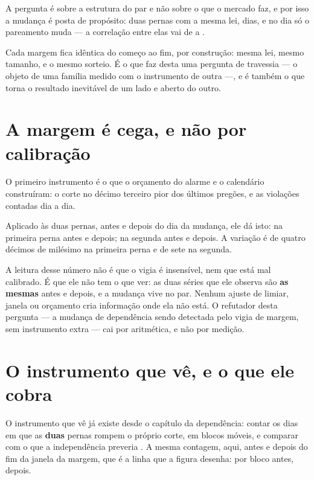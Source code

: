 A pergunta é sobre a estrutura do par e não sobre o que o mercado faz, e por isso a mudança é posta de
propósito: duas pernas com a mesma lei, \numVizinhancaDias{} dias, e no dia
\numVizinhancaQuando{} só o pareamento muda --- a correlação entre elas vai de
\numVizinhancaRhoAntes{} a \numVizinhancaRhoDepois.

Cada margem fica idêntica do começo ao fim, por construção: mesma lei, mesmo tamanho, e o mesmo
sorteio. É o que faz desta uma pergunta de travessia --- o objeto de uma família medido com o
instrumento de outra ---, e é também o que torna o resultado inevitável de um lado e aberto do
outro.

\section{A margem é cega, e não por calibração}

O primeiro instrumento é o que o orçamento do alarme e o calendário construíram: o corte no décimo terceiro pior dos
últimos \numCorteJanela{} pregões, e as violações contadas dia a dia.

Aplicado às duas pernas, antes e depois do dia da mudança, ele dá isto: \numVizinhancaTaxaAAntes{}
na primeira perna antes e \numVizinhancaTaxaADepois{} depois; \numVizinhancaTaxaBAntes{} na segunda
antes e \numVizinhancaTaxaBDepois{} depois. A variação é de quatro décimos de milésimo na primeira perna e de sete na segunda.

A leitura desse número não é que o vigia é insensível, nem que está mal calibrado. É que ele não
tem o que ver: as duas séries que ele observa são \textbf{as mesmas} antes e depois, e a mudança vive
no par. Nenhum ajuste de limiar, janela ou orçamento cria informação onde ela não está. O
refutador desta pergunta --- a mudança de dependência sendo detectada pelo vigia de margem, sem
instrumento extra --- cai por aritmética, e não por medição.

\section{O instrumento que vê, e o que ele cobra}

O instrumento que vê já existe desde o capítulo da dependência: contar os dias em que as \textbf{duas}
pernas rompem o próprio corte, em blocos móveis, e comparar com o que a independência preveria
\cite{garcin2026nonparametric}. A
mesma contagem, aqui, antes e depois do fim da janela da margem, que é a linha que a figura
desenha: \numVizinhancaConjuntoAntes{} por bloco antes, \numVizinhancaConjuntoDepois{} depois.

